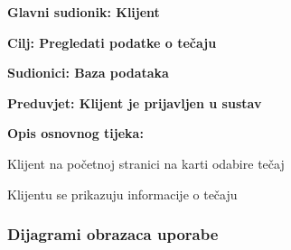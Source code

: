 						\noindent {}
						\begin{packed_item}
							
							\item \textbf{Glavni sudionik: Klijent}
							\item  \textbf{Cilj: Pregledati podatke o tečaju} 
							\item  \textbf{Sudionici: Baza podataka}
							\item  \textbf{Preduvjet: Klijent je prijavljen u sustav}
							\item  \textbf{Opis osnovnog tijeka: }
							
							\item[] \begin{packed_enum}
								
								\item Klijent na početnoj stranici na karti odabire tečaj
								\item Klijentu se prikazuju informacije o tečaju	
							\end{packed_enum}
							
						\end{packed_item}
					
							

					
				\subsubsection{Dijagrami obrazaca uporabe}
					
	
